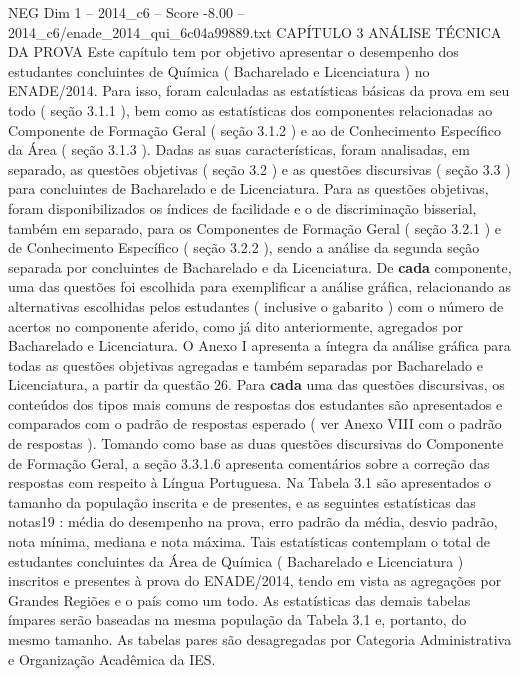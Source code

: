 \begin{textsample}{NEG Dim 1 – 2014\_c6 – Score -8.00 – 2014\_c6/enade\_2014\_qui\_6c04a99889.txt}  \label{ex:f1_neg_016}
CAPÍTULO 3 ANÁLISE TÉCNICA DA PROVA Este capítulo tem por objetivo apresentar o desempenho dos estudantes concluintes de Química ( Bacharelado e Licenciatura ) no ENADE/2014.
Para isso, foram calculadas as estatísticas básicas da prova em seu todo ( seção 3.1.1 ), bem como as estatísticas dos componentes relacionadas ao Componente de Formação Geral ( seção 3.1.2 ) e ao de Conhecimento Específico da Área ( seção 3.1.3 ).
Dadas as suas características, foram analisadas, em separado, as questões objetivas ( seção 3.2 ) e as questões discursivas ( seção 3.3 ) para concluintes de Bacharelado e de Licenciatura.
Para as questões objetivas, foram disponibilizados os índices de facilidade e o de discriminação bisserial, também em separado, para os Componentes de Formação Geral ( seção 3.2.1 ) e de Conhecimento Específico ( seção 3.2.2 ), sendo a análise da segunda seção separada por concluintes de Bacharelado e da Licenciatura.
De \textbf{cada} componente, uma das questões foi escolhida para exemplificar a análise gráfica, relacionando as alternativas escolhidas pelos estudantes ( inclusive o gabarito ) com o número de acertos no componente aferido, como já dito anteriormente, agregados por Bacharelado e Licenciatura.
O Anexo I apresenta a íntegra da análise gráfica para todas as questões objetivas agregadas e também separadas por Bacharelado e Licenciatura, a partir da questão 26.
Para \textbf{cada} uma das questões discursivas, os conteúdos dos tipos mais comuns de respostas dos estudantes são apresentados e comparados com o padrão de respostas esperado ( ver Anexo VIII com o padrão de respostas ).
Tomando como base as duas questões discursivas do Componente de Formação Geral, a seção 3.3.1.6 apresenta comentários sobre a correção das respostas com respeito à Língua Portuguesa.
Na Tabela 3.1 são apresentados o tamanho da população inscrita e de presentes, e as seguintes estatísticas das notas19 : média do desempenho na prova, erro padrão da média, desvio padrão, nota mínima, mediana e nota máxima.
Tais estatísticas contemplam o total de estudantes concluintes da Área de Química ( Bacharelado e Licenciatura ) inscritos e presentes à prova do ENADE/2014, tendo em vista as agregações por Grandes Regiões e o país como um todo.
As estatísticas das demais tabelas ímpares serão baseadas na mesma população da Tabela 3.1 e, portanto, do mesmo tamanho.
As tabelas pares são desagregadas por Categoria Administrativa e Organização Acadêmica da IES.

\end{textsample}
